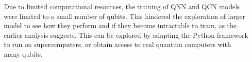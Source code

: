 Due to limited computational resources, the training of QNN and QCN models were limited to a small number of qubits. This hindered the exploration of larger model to see how they perform and if they become intractable to train, as the earlier analysis suggests. This can be explored by adapting the Python framework to run on supercomputers, or obtain access to real quantum computers with many qubits.




